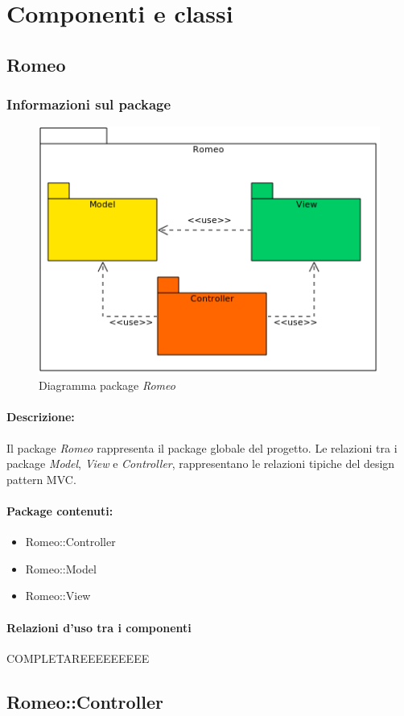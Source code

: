 \section{Componenti e classi}
	\subsection{Romeo}
		\subsubsection{Informazioni sul package}
			\begin{figure}[!h]
				\centering
				\includegraphics[scale=0.5]{./Content/Immagini/Romeo.png}
				\caption{Diagramma package \textsl{Romeo}}
			\end{figure}
			\paragraph{Descrizione:}Il package\g{} \textsl{Romeo} rappresenta il package\g{} globale del progetto. Le relazioni tra i package\g{} \textsl{Model}, \textsl{View} e \textsl{Controller}, rappresentano le relazioni tipiche del design pattern\g{} MVC\g{}.
			\paragraph{Package contenuti:}
				\begin{itemize}
					\item Romeo::Controller
					\item Romeo::Model
					\item Romeo::View
				\end{itemize}
			\paragraph{Relazioni d'uso tra i componenti}
COMPLETAREEEEEEEEE	\subsection{Romeo::Controller}
